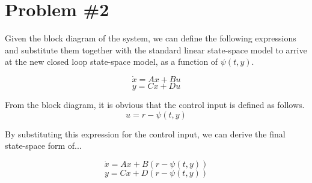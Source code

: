 \section*{Problem \#2}

Given the block diagram of the system, we can define the following expressions and substitute them together with the standard linear state-space model to arrive at the new closed loop state-space model, as a function of $\psi(t, y)$.


    $$\dot{x} = A x + Bu $$
    $$y = Cx + Du $$

\noindent From the block diagram, it is obvious that the control input is defined as follows.
$$ u = r - \psi(t,y) $$

\noindent By substituting this expression for the control input, we can derive the final state-space form of...

$$  \dot{x} = Ax + B\left( r - \psi(t,y) \right) $$
$$ y = Cx + D(r - \psi(t,y)) $$
